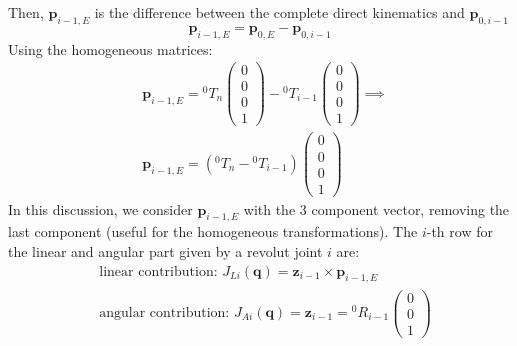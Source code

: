 \documentclass[10pt, letterpaper]{report}
\begin{document}
Then, $\mathbf p_{i-1,E}$ is the difference between the complete direct kinematics and $\mathbf p_{0,i-1}$\begin{equation}
    \mathbf p_{i-1,E}=\mathbf p_{0,E}-\mathbf p_{0,i-1}
\end{equation}
Using the homogeneous matrices:\begin{align}
     &\mathbf p_{i-1,E}={}^0T_{n}\begin{pmatrix}
        0\\0\\0\\1
    \end{pmatrix}-{}^{0}T_{i-1}\begin{pmatrix}
        0\\0\\0\\1
    \end{pmatrix}\implies \\
    &\mathbf p_{i-1,E}=({}^0T_{n}-{}^{0}T_{i-1})\begin{pmatrix}
        0\\0\\0\\1
    \end{pmatrix}
\end{align}
In this discussion, we consider $\mathbf p_{i-1,E}$ with the 3 component vector, removing the last component (useful for the homogeneous transformations).
The $i$-th row for the linear and angular part given by a revolut joint $i$ are:\begin{align}
    &\text{linear contribution: }J_{Li}(\mathbf q)=\mathbf z_{i-1}\times \mathbf p_{i-1,E}\\
    &\text{angular contribution: }J_{Ai}(\mathbf q)=\mathbf z_{i-1}={}^0R_{i-1}\begin{pmatrix}
        0\\ 0\\ 1
    \end{pmatrix}\\
\end{align}
\end{document}
